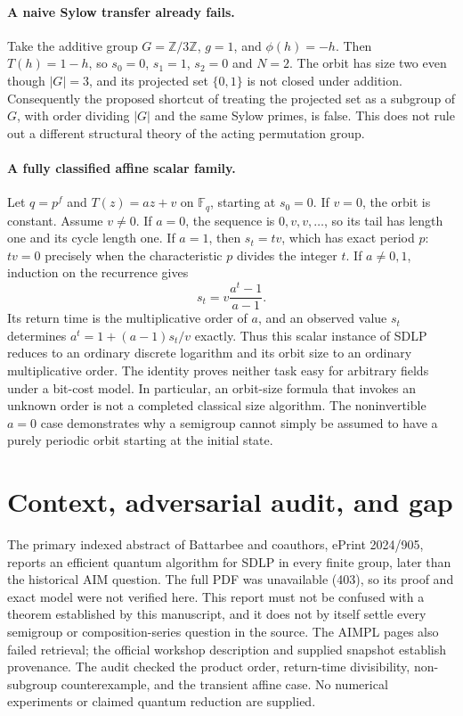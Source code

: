 \documentclass[11pt]{article}
\begin{document}
\paragraph{A naive Sylow transfer already fails.}
Take the additive group $G=\mathbb Z/3\mathbb Z$, $g=1$, and $\phi(h)=-h$.
Then $T(h)=1-h$, so $s_0=0$, $s_1=1$, $s_2=0$ and $N=2$.
The orbit has size two even though $|G|=3$, and its projected set
$\{0,1\}$ is not closed under addition. Consequently the proposed shortcut
of treating the projected set as a subgroup of $G$, with order dividing
$|G|$ and the same Sylow primes, is false. This does not rule out a different
structural theory of the acting permutation group.

\paragraph{A fully classified affine scalar family.}
Let $q=p^f$ and $T(z)=az+v$ on $\mathbb F_q$, starting at $s_0=0$.
If $v=0$, the orbit is constant. Assume $v\ne0$.
If $a=0$, the sequence is $0,v,v,\ldots$, so its tail has length one and
its cycle length one. If $a=1$, then $s_t=tv$, which has exact period $p$:
$tv=0$ precisely when the characteristic $p$ divides the integer $t$.
If $a\ne0,1$, induction on the recurrence gives
\[
s_t=v\frac{a^t-1}{a-1}.
\]
Its return time is the multiplicative order of $a$, and an observed value
$s_t$ determines $a^t=1+(a-1)s_t/v$ exactly. Thus this scalar instance of
SDLP reduces to an ordinary discrete logarithm and its orbit size to an
ordinary multiplicative order. The identity proves neither task easy for
arbitrary fields under a bit-cost model. In particular, an orbit-size formula
that invokes an unknown order is not a completed classical size algorithm.
The noninvertible $a=0$ case demonstrates why a semigroup cannot simply be
assumed to have a purely periodic orbit starting at the initial state.

\section{Context, adversarial audit, and gap}
The primary indexed abstract of Battarbee and coauthors, ePrint 2024/905,
reports an efficient quantum algorithm for SDLP in every finite group, later
than the historical AIM question. The full PDF was unavailable (403), so its
proof and exact model were not verified here. This report must not be confused
with a theorem established by this manuscript, and it does not by itself
settle every semigroup or composition-series question in the source.
The AIMPL pages also failed retrieval; the official workshop description and
supplied snapshot establish provenance. The audit checked the product order,
return-time divisibility, non-subgroup counterexample, and the transient affine
case. No numerical experiments or claimed quantum reduction are supplied.
\end{document}
